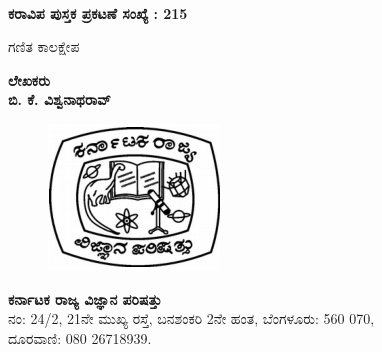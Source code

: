 

~

\hfill{\bfseries ಕರಾವಿಪ ಪುಸ್ತಕ ಪ್ರಕಟಣೆ ಸಂಖ್ಯೆ : {\rm 215}}

\vfill 

\thispagestyle{empty}
\begin{center}
{\fontsize{30}{32}\selectfont ಗಣಿತ ಕಾಲಕ್ಷೇಪ}
\vfill


{\Large\bfseries ಲೇಖಕರು}\\[4pt]
{\LARGE\bfseries ಬಿ. ಕೆ. ವಿಶ್ವನಾಥರಾವ್}\\[4pt]
\vfill

\begin{figure}[H]
\centering
\includegraphics[scale=.7]{images/logo.eps}
\end{figure}

{\Large\bfseries ಕರ್ನಾಟಕ ರಾಜ್ಯ ವಿಜ್ಞಾನ ಪರಿಷತ್ತು}\\
ನಂ: {\rm 24/2}, {\rm 21}ನೇ ಮುಖ್ಯ ರಸ್ತೆ, ಬನಶಂಕರಿ {\rm 2}ನೇ ಹಂತ, ಬೆಂಗಳೂರು: {\rm 560 070},\\
ದೂರವಾಣಿ: {\rm 080 26718939.}


\end{center}
